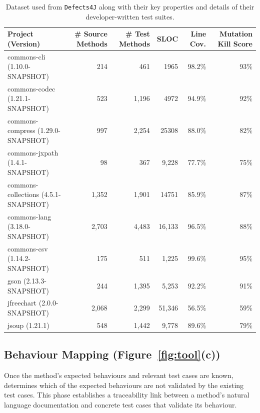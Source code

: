 \begin{table}[b]
\centering
\caption{Dataset used from \texttt{Defects4J} along with their key properties and details of their developer-written test suites.} 
\label{tab:repositories}
\begin{tabular}{lrrrrr}
        \toprule
        \textbf{Project (Version)} & \textbf{\# Source Methods} & \textbf{\# Test Methods} & \textbf{SLOC} & \textbf{Line Cov.} & \textbf{Mutation Kill Score} \\
        \midrule
        commons-cli (1.10.0-SNAPSHOT) & 214 & 461 & 1965 & 98.2\% & 93\% \\
        commons-codec (1.21.1-SNAPSHOT) & 523 & 1,196 & 4972 & 94.9\% & 92\% \\
        commons-compress (1.29.0-SNAPSHOT) & 997 & 2,254 & 25308 & 88.0\% & 82\% \\
        commons-jxpath (1.4.1-SNAPSHOT) & 98 & 367 & 9,228 & 77.7\% & 75\% \\
        commons-collections (4.5.1-SNAPSHOT) & 1,352 & 1,901 & 14751 & 85.9\% & 87\% \\
        commons-lang (3.18.0-SNAPSHOT) & 2,703 & 4,483 & 16,133 & 96.5\% & 88\% \\
        commons-csv (1.14.2-SNAPSHOT) & 175 & 511 & 1,225 & 99.6\% & 95\% \\
        gson (2.13.3-SNAPSHOT) & 244 & 1,395 & 5,253 & 92.2\% & 91\% \\
        jfreechart (2.0.0-SNAPSHOT) & 2,068 & 2,299 & 51,346 & 56.5\% & 59\% \\
        jsoup (1.21.1) & 548 & 1,442 & 9,778 & 89.6\% & 79\% \\
        \bottomrule
    \end{tabular}
    \vspace{-1.0em}
\end{table}


\subsection{Behaviour Mapping (Figure~\ref{fig:tool}(c))} 
\label{sec:approach:mapping}

Once the method's expected behaviours and relevant test cases are known, \toolname{} determines which of the expected behaviours are not validated by the existing test cases. 
This phase establishes a traceability link between a method's natural language documentation and concrete test cases that validate its behaviour.


